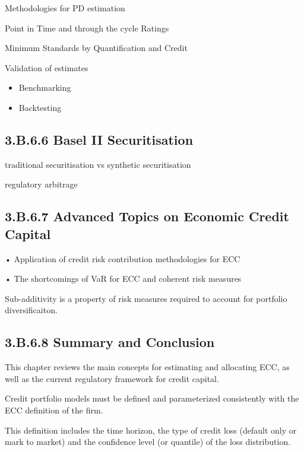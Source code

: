Methodologies for PD estimation

Point in Time and through the cycle Ratings

Minimum Standards by Quantification and Credit

Validation of estimates

\begin{itemize}
\item Benchmarking
\item Backtesting 
\end{itemize}

\subsection*{3.B.6.6 Basel II Securitisation}

traditional securitisation vs synthetic securitisation

regulatory arbitrage


 

\subsection*{3.B.6.7 Advanced Topics on Economic Credit Capital}

•
Application of credit risk contribution methodologies for ECC

•
The shortcomings of VaR for ECC and coherent risk measures




Sub-additivity is a property of risk measures required to account for portfolio diversificaiton.

 

\subsection*{3.B.6.8 Summary and Conclusion}

 


This chapter reviews the main concepts for estimating and allocating ECC, as well as the current regulatory framework for credit capital.


Credit portfolio models must be defined and parameterized consistently with the ECC definition of the firm.

This definition includes the time horizon, the type of credit loss (default only or mark to market) and the confidence level (or quantile) of the loss distribution.



